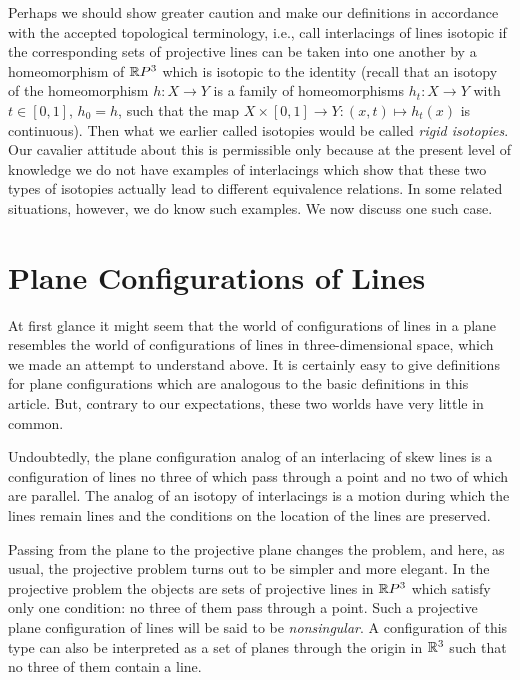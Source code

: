 \documentclass{article}
\begin{document}
Perhaps we should show greater caution and make our definitions in accordance
with the accepted topological terminology, i.e., call interlacings of lines
isotopic if the corresponding sets of projective lines can be taken into one
another by a homeomorphism of $\mathbb{R} P^3$ which is isotopic to the identity
(recall that an isotopy of the homeomorphism $h\colon X\to Y$ is a family of
homeomorphisms $h_t\colon X\to Y$ with $t\in[0,1]$, $h_0=h$, such that the map
$X\times[0,1]\to Y\colon(x,t)\mapsto h_t(x)$ is continuous). Then what we
earlier called isotopies would be called {\it rigid isotopies\/}. Our cavalier
attitude about this is permissible only because at the present level of
knowledge we do not have examples of interlacings which show that these two
types of isotopies actually lead to different equivalence relations. In some
related situations, however, we do know such examples. We now discuss one such
case.

\section{Plane Configurations of Lines}

At first glance it might seem that the world of configurations of lines in a
plane resembles the world of configurations of lines in three-dimensional
space, which we made an attempt to understand above. It is certainly easy to
give definitions for plane configurations which are analogous to the basic
definitions in this article. But, contrary to our expectations, these two worlds
have very little in common.

Undoubtedly, the plane configuration analog of an interlacing of skew lines is
a configuration of lines no three of which pass through a point and no two of
which are parallel. The analog of an isotopy of interlacings is a motion during
which the lines remain lines and the conditions on the location of the lines
are preserved.

Passing from the plane to the projective plane changes the problem, and here,
as usual, the projective problem turns out to be simpler and more elegant. In
the projective problem the objects are sets of projective lines in $\mathbb{R} P^3$
which satisfy only one condition: no three of them pass through a point. Such a
projective plane configuration of lines will be said to be {\it nonsingular\/}.
A configuration of this type can also be interpreted as a set of planes through
the origin in $\mathbb{R}^3$ such that no three of them contain a line.
\end{document}
